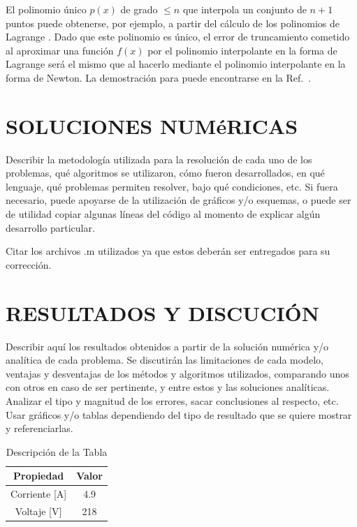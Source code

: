 \documentclass[a4paper, 10pt, conference]{ieeeconf}      %
\begin{document}
El polinomio \'unico $p(x)$ de grado $\leq n$ que interpola un conjunto de $n+1$ puntos puede obtenerse, por ejemplo, a partir del c\'alculo de los polinomios de Lagrange \cite{c6}. Dado que este polinomio es \'unico, el error de truncamiento cometido al aproximar una funci\'on $f(x)$ por el polinomio interpolante en la forma de Lagrange ser\'a el mismo que al hacerlo mediante el polinomio interpolante en la forma de Newton. La demostraci\'on para puede encontrarse en la Ref.~\cite{c7}.

\section{SOLUCIONES NUM\'eRICAS}

Describir la metodolog\'ia utilizada para la resoluci\'on de cada uno de los problemas, qu\'e algoritmos se utilizaron, c\'omo fueron desarrollados, en qu\'e lenguaje, qu\'e problemas permiten resolver, bajo qu\'e condiciones, etc. Si fuera necesario, puede apoyarse de la utilizaci\'on de gr\'aficos y/o esquemas, o puede ser de utilidad copiar algunas l\'ineas del c\'odigo al momento de explicar alg\'un desarrollo particular.

Citar los archivos .m utilizados ya que estos deber\'an ser entregados para su correcci\'on.


\section{RESULTADOS Y DISCUCI\'ON}

Describir aqu\'i los resultados obtenidos a partir de la soluci\'on num\'erica y/o anal\'itica de cada problema. Se discutir\'an las limitaciones de cada modelo, ventajas y desventajas de los m\'etodos y algoritmos utilizados, comparando unos con otros en caso de ser pertinente, y entre estos y las soluciones anal\'iticas. Analizar el tipo y magnitud de los errores, sacar conclusiones al respecto, etc. Usar gr\'aficos y/o tablas dependiendo del tipo de resultado que se quiere mostrar y referenciarlas.

\begin{table}[h]
\begin{center}
\begin{tabular}{|c||c|}
\hline
Propiedad & Valor\\
\hline
Corriente [A]& 4.9\\
\hline
Voltaje [V]& 218\\
\hline
\end{tabular}
\end{center}
\caption{Descripci\'on de la Tabla}
\label{tab:simple}
\end{table}
\end{document}
